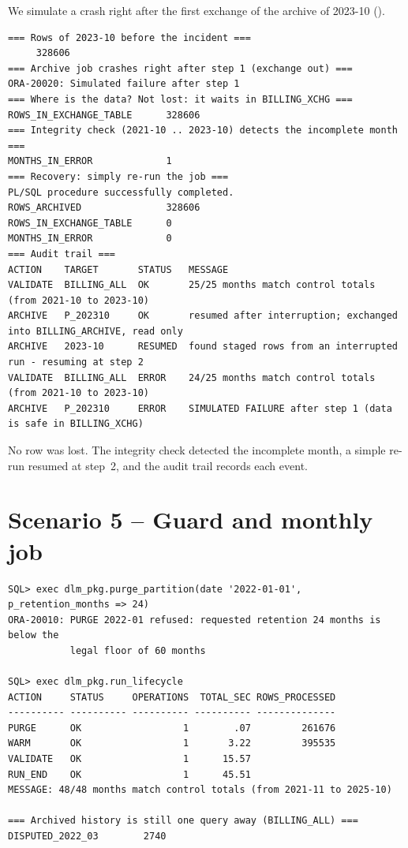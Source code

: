 We simulate a crash right after the first exchange of the archive of 2023-10
().

\needspace{0.3\textheight}
\begin{lstlisting}[style=console, caption={Incident and recovery (\code{scripts/06\_demo.sh 4}, 16 s in total)}]
=== Rows of 2023-10 before the incident ===
     328606
=== Archive job crashes right after step 1 (exchange out) ===
ORA-20020: Simulated failure after step 1
=== Where is the data? Not lost: it waits in BILLING_XCHG ===
ROWS_IN_EXCHANGE_TABLE      328606
=== Integrity check (2021-10 .. 2023-10) detects the incomplete month ===
MONTHS_IN_ERROR             1
=== Recovery: simply re-run the job ===
PL/SQL procedure successfully completed.
ROWS_ARCHIVED               328606
ROWS_IN_EXCHANGE_TABLE      0
MONTHS_IN_ERROR             0
=== Audit trail ===
ACTION    TARGET       STATUS   MESSAGE
VALIDATE  BILLING_ALL  OK       25/25 months match control totals (from 2021-10 to 2023-10)
ARCHIVE   P_202310     OK       resumed after interruption; exchanged into BILLING_ARCHIVE, read only
ARCHIVE   2023-10      RESUMED  found staged rows from an interrupted run - resuming at step 2
VALIDATE  BILLING_ALL  ERROR    24/25 months match control totals (from 2021-10 to 2023-10)
ARCHIVE   P_202310     ERROR    SIMULATED FAILURE after step 1 (data is safe in BILLING_XCHG)
\end{lstlisting}

No row was lost. The integrity check detected the incomplete month, a simple re-run resumed
at step~2, and the audit trail records each event.

\section{Scenario 5 -- Guard and monthly job}

\needspace{0.3\textheight}
\begin{lstlisting}[style=console, caption={Guard, then the monthly job for 2026-11 (46 s)}]
SQL> exec dlm_pkg.purge_partition(date '2022-01-01', p_retention_months => 24)
ORA-20010: PURGE 2022-01 refused: requested retention 24 months is below the
           legal floor of 60 months

SQL> exec dlm_pkg.run_lifecycle
ACTION     STATUS     OPERATIONS  TOTAL_SEC ROWS_PROCESSED
---------- ---------- ---------- ---------- --------------
PURGE      OK                  1        .07         261676
WARM       OK                  1       3.22         395535
VALIDATE   OK                  1      15.57
RUN_END    OK                  1      45.51
MESSAGE: 48/48 months match control totals (from 2021-11 to 2025-10)

=== Archived history is still one query away (BILLING_ALL) ===
DISPUTED_2022_03        2740
\end{lstlisting}

